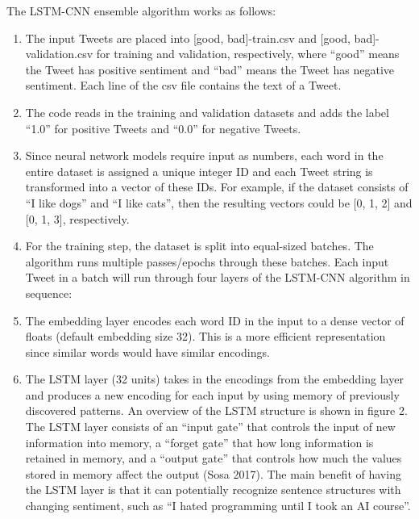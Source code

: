 \documentclass[letterpaper]{article} %
\begin{document}
The LSTM-CNN ensemble algorithm works as follows:
\begin{enumerate}
	\item The input Tweets are placed into [good, bad]-train.csv and [good, bad]-validation.csv for training and validation, respectively, where \textquotedblleft{}good\textquotedblright{} means the Tweet has positive sentiment and \textquotedblleft{}bad\textquotedblright{} means the Tweet has negative sentiment. Each line of the csv file contains the text of a Tweet.
	\item The code reads in the training and validation datasets and adds the label \textquotedblleft{}1.0\textquotedblright{} for positive Tweets and \textquotedblleft{}0.0\textquotedblright{} for negative Tweets.
	\item Since neural network models require input as numbers, each word in the entire dataset is assigned a unique integer ID and each Tweet string is transformed into a vector of these IDs. For example, if the dataset consists of \textquotedblleft{}I like dogs\textquotedblright{} and \textquotedblleft{}I like cats\textquotedblright{}, then the resulting vectors could be [0, 1, 2] and [0, 1, 3], respectively.
	\item For the training step, the dataset is split into equal-sized batches. The algorithm runs multiple passes/epochs through these batches. Each input Tweet in a batch will run through four layers of the LSTM-CNN algorithm in sequence:
	\item The embedding layer encodes each word ID in the input to a dense vector of floats (default embedding size 32). This is a more efficient representation since similar words would have similar encodings.
	\item The LSTM layer (32 units) takes in the encodings from the embedding layer and produces a new encoding for each input by using memory of previously discovered patterns. An overview of the LSTM structure is shown in figure 2. The LSTM layer consists of an \textquotedblleft{}input gate\textquotedblright{} that controls the input of new information into memory, a \textquotedblleft{}forget gate\textquotedblright{} that how long information is retained in memory, and a \textquotedblleft{}output gate\textquotedblright{} that controls how much the values stored in memory affect the output (Sosa 2017). The main benefit of having the LSTM layer is that it can potentially recognize sentence structures with changing sentiment, such as \textquotedblleft{}I hated programming until I took an AI course\textquotedblright{}. 

\end{enumerate}
\end{document}
